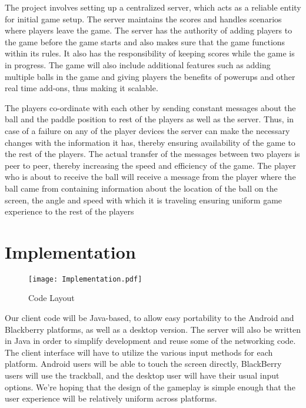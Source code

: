 \documentclass{sig-alternate}
\begin{document}
The project involves setting up a centralized server, which acts as a
reliable entity for initial game setup.  The server maintains the scores
and handles scenarios where players leave the game.  The server has the
authority of adding players to the game before the game starts and also
makes sure that the game functions within its rules.  It also has the
responsibility of keeping scores while the game is in progress.  The game
will also include additional features such as adding multiple balls in the
game and giving players the benefits of powerups and other real time
add-ons, thus making it scalable.  

The players co-ordinate with each other by sending constant messages about
the ball and the paddle position to rest of the players as well as the
server.  Thus, in case of a failure on any of the player devices the server
can make the necessary changes with the information it has, thereby
ensuring availability of the game to the rest of the players.  The actual
transfer of the messages between two players is peer to peer, thereby
increasing the speed and efficiency of the game.  The player who is about
to receive the ball will receive a message from the player where the ball
came from containing information about the location of the ball on the
screen, the angle and speed with which it is traveling ensuring uniform
game experience to the rest of the players

\section{Implementation}
\label{implementation}

\begin{figure}[htb]
	\label{code layout}
	\begin{center}
		\texttt{[image: Implementation.pdf]}
		\caption{Code Layout}
	\end{center}
\end{figure}


Our client code will be Java-based, to allow easy portability to the
Android and Blackberry platforms, as well as a desktop version.  The server
will also be written in Java in order to simplify development and reuse
some of the networking code.  The client interface will have to utilize the
various input methods for each platform.  Android users will be able to
touch the screen directly, BlackBerry users will use the trackball, and the
desktop user will have their usual input options.  We're hoping that the
design of the gameplay is simple enough that the user experience will be
relatively uniform across platforms.
\end{document}
